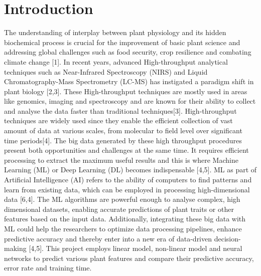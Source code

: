 \documentclass[12pt,a4paper]{report}
\begin{document}
\chapter{Introduction}
The understanding of interplay between plant physiology and its hidden biochemical process is crucial for the improvement of basic plant science and addressing global challenges such as food security, crop resilience and combating climate change [1]. 
In recent years, advanced High-throughput analytical techniques such as Near-Infrared Spectroscopy (NIRS) and Liquid Chromatography-Mass Spectrometry (LC-MS) has instigated a paradigm shift in plant biology [2,3].
These High-throughput techniques are mostly used in areas like genomics, imaging and spectroscopy and are known for their ability to collect and analyse the data faster than traditional techniques[3].
High-throughput techniques are widely used since they enable the efficient collection of vast amount of data at various scales, from molecular to field level over significant time periods[4].
The big data generated by these high throughput procedures present both opportunities and challenges at the same time. It requires efficient processing to extract the maximum useful results and this is where Machine Learning (ML) or Deep Learning (DL) becomes indispensable [4,5].
ML as part of Artificial Intelligence (AI) refers to the ability of computers to find patterns and learn from existing data, which can be employed in processing high-dimensional data [6,4]. The ML algorithms are powerful enough to analyse complex, high dimensional datasets, 
enabling accurate predictions of plant traits or other features based on the input data. Additionally, integrating these big data with ML could help the researchers to optimize data processing pipelines, enhance predictive accuracy and thereby enter into a new era of data-driven decision-making [4,5]. This project employs linear model, non-linear model and neural networks to predict various plant features and compare their predictive accuracy, error rate and training time. \\
\end{document}

